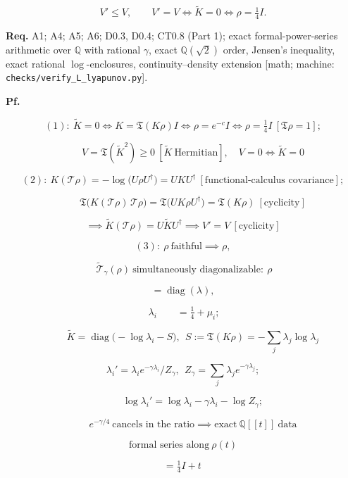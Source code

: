 \begin{theorem}
\[
V'\le V,\qquad V'=V\iff\tilde K=0\iff\rho=\tfrac14I .
\]

\textbf{Req.} A1; A4; A5; A6; D0.3, D0.4; CT0.8 (Part 1); exact formal-power-series arithmetic over $\mathbb Q$ with rational $\gamma$, exact $\mathbb Q(\sqrt2)$ order, Jensen's inequality, exact rational $\log$-enclosures, continuity–density extension [math; machine: \texttt{checks/\allowbreak{}verify\_\allowbreak{}L\_\allowbreak{}lyapunov.py}].

\textbf{Pf.}

\[
(1):\ \tilde K=0\iff K=\mathfrak T(K\rho)I\iff\rho=e^{-c}I\iff\rho=\tfrac14I\ [\mathfrak T\rho=1];
\]

\[
\qquad V=\mathfrak T(\tilde K^2)\ge0\ [\tilde K\ \text{Hermitian}],\quad V=0\iff\tilde K=0
\]

\[
(2):\ K(\mathcal T\rho)=-\log\bigl(U\rho U^\dagger\bigr)=UKU^\dagger\ [\text{functional-calculus covariance}];
\]

\[
\qquad \mathfrak T\bigl(K(\mathcal T\rho)\,\mathcal T\rho\bigr)=\mathfrak T\bigl(UK\rho U^\dagger\bigr)=\mathfrak T(K\rho)\ [\text{cyclicity}]
\]

\[
\implies\tilde K(\mathcal T\rho)=U\tilde KU^\dagger\implies V'=V\ [\text{cyclicity}]
\]

\[
(3):\ \rho\ \text{faithful}\implies\rho,
\]

\[
\ \tilde{\mathcal T}_\gamma(\rho)\ \text{simultaneously diagonalizable}:\ \rho
\]

\[
= \operatorname{diag}(\lambda),
\]

\[
\ \lambda_i\qquad = \tfrac14+\mu_i;
\]

\[
\qquad \tilde K=\operatorname{diag}\bigl(-\log\lambda_i-S\bigr),\ \ S:=\mathfrak T(K\rho)=-\textstyle\sum_j\lambda_j\log\lambda_j
\]

\[
\lambda_i'=\lambda_ie^{-\gamma\lambda_i}/Z_\gamma,\ \ Z_\gamma=\textstyle\sum_j\lambda_je^{-\gamma\lambda_j};
\]

\[
\qquad \log\lambda_i'=\log\lambda_i-\gamma\lambda_i-\log Z_\gamma;
\]

\[
\qquad e^{-\gamma/4}\ \text{cancels in the ratio}\implies\text{exact}\ \mathbb Q[[t]]\ \text{data}
\]

\[
\text{formal series along}\ \rho(t)
\]

\[
= \tfrac14I+t\,
\]


\end{theorem}
